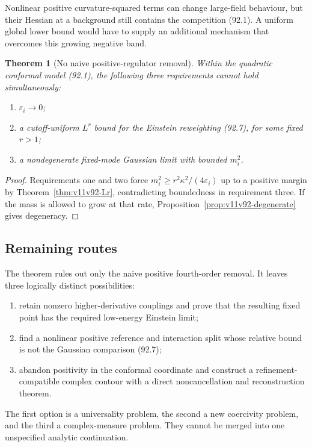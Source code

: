 \documentclass[11pt]{article}
\newtheorem{theorem}{Theorem}[section]
\begin{document}
Nonlinear positive curvature-squared terms can change large-field
behaviour, but their Hessian at a background still contains the
competition (92.1).  A uniform global lower bound would have to
supply an additional mechanism that overcomes this growing negative
band.

\begin{theorem}[No naive positive-regulator removal]
\label{thm:v11v92-no-go}
Within the quadratic conformal model (92.1), the following three
requirements cannot hold simultaneously:
\begin{enumerate}
\item \(\varepsilon_i\to0\);
\item a cutoff-uniform \(L^r\) bound for the Einstein reweighting
      (92.7), for some fixed \(r>1\);
\item a nondegenerate fixed-mode Gaussian limit with bounded
      \(m_i^2\).
\end{enumerate}
\end{theorem}

\begin{proof}
Requirements one and two force
\(m_i^2\ge r^2\kappa^2/(4\varepsilon_i)\) up to a positive margin by
Theorem~\ref{thm:v11v92-Lr}, contradicting boundedness in requirement
three.  If the mass is allowed to grow at that rate,
Proposition~\ref{prop:v11v92-degenerate} gives degeneracy.
\end{proof}

\subsection{Remaining routes}

The theorem rules out only the naive positive fourth-order removal.
It leaves three logically distinct possibilities:
\begin{enumerate}
\item retain nonzero higher-derivative couplings and prove that the
      resulting fixed point has the required low-energy Einstein
      limit;
\item find a nonlinear positive reference and interaction split whose
      relative bound is not the Gaussian comparison (92.7);
\item abandon positivity in the conformal coordinate and construct a
      refinement-compatible complex contour with a direct
      noncancellation and reconstruction theorem.
\end{enumerate}

The first option is a universality problem, the second a new
coercivity problem, and the third a complex-measure problem.  They
cannot be merged into one unspecified analytic continuation.
\end{document}
